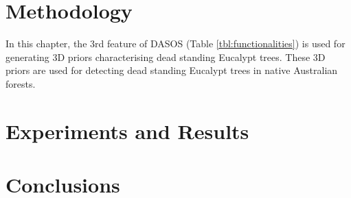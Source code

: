 \documentclass{subfiles}
\begin{document}
\section{Methodology}

\par In this chapter, the 3rd feature of DASOS (Table \ref{tbl:functionalities}) is used for generating 3D priors characterising dead standing Eucalypt trees. These 3D priors are used for detecting dead standing Eucalypt trees in native Australian forests. 

\section{Experiments and Results}

\section{Conclusions}
\end{document}
